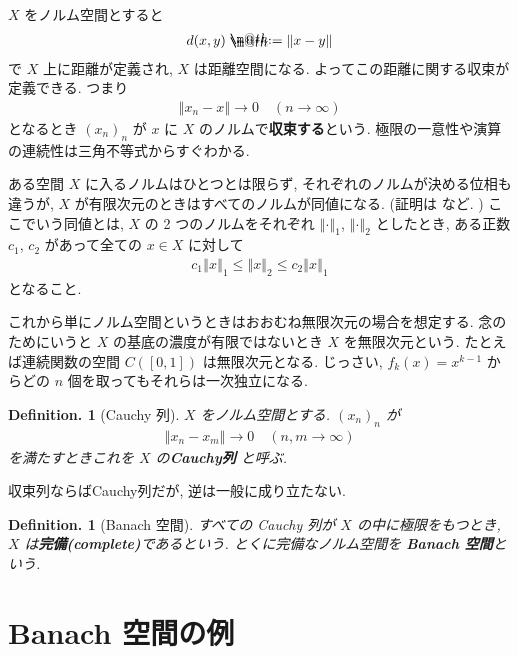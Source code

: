 \documentclass[openany, a4paper, oneside]{jsbook}
\makeatletter
\newcommand*{\defeq}{\mathrel{\rlap{%
\raisebox{0.3ex}{$\m@th\cdot$}}%
\raisebox{-0.3ex}{$\m@th\cdot$}}%
=}
\theoremstyle{break}
\theoremstyle{breakdefn}
\newtheorem{defn}[thm]{Definition.}
\newcommand{\norm}[1]{\left\Vert#1\right\Vert}
\makeatother
\begin{document}
$X$ をノルム空間とすると
\begin{align}
 d(x, y)
 \defeq
 \norm{x - y}
\end{align}
で $X$ 上に距離が定義され, $X$ は距離空間になる.
よってこの距離に関する収束が定義できる.
つまり
\begin{align}
 \norm{x_n - x} \to 0 \quad (n \to \infty)
\end{align}
となるとき $(x_n)_n$ が $x$ に $X$ のノルムで\textbf{収束する}という.
極限の一意性や演算の連続性は三角不等式からすぐわかる.

ある空間 $X$ に入るノルムはひとつとは限らず, それぞれのノルムが決める位相も違うが,
$X$ が有限次元のときはすべてのノルムが同値になる.
(証明は \cite{ShigetoshiKuroda1} など. )
ここでいう同値とは, $X$ の 2 つのノルムをそれぞれ $\norm{\cdot}_1$, $\norm{\cdot}_2$ としたとき,
ある正数 $c_1$, $c_2$ があって全ての $x \in X$ に対して
\begin{align}
 c_1 \norm{x}_1
 \leq
 \norm{x}_2
 \leq
 c_2 \norm{x}_1
\end{align}
となること.

これから単にノルム空間というときはおおむね無限次元の場合を想定する.
念のためにいうと $X$ の基底の濃度が有限ではないとき $X$ を無限次元という.
たとえば連続関数の空間 $C([0, 1])$ は無限次元となる.
じっさい, $f_k(x) = x^{k-1}$ からどの $n$ 個を取ってもそれらは一次独立になる.

\begin{defn}[Cauchy 列]
 $X$ をノルム空間とする.
 $(x_n)_n$ が
 \begin{align}
  \norm{x_n - x_m} \to 0 \quad (n, m \to \infty)
 \end{align}
 を満たすときこれを $X$ の\textbf{Cauchy列} と呼ぶ.
\end{defn}
収束列ならばCauchy列だが, 逆は一般に成り立たない.

\begin{defn}[Banach 空間]
すべての Cauchy 列が $X$ の中に極限をもつとき, $X$ は\textbf{完備(complete)}であるという.
とくに完備なノルム空間を \textbf{Banach 空間}という.
\end{defn}
\section{Banach 空間の例}
\end{document}
